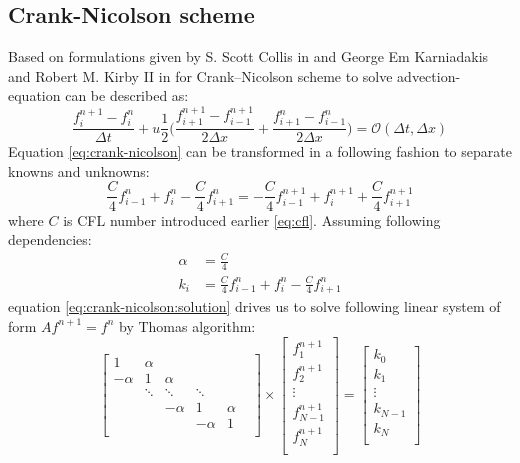 \subsection{Crank-Nicolson scheme} \label{s:general-approach:crank-nicolson-analysis}
	Based on formulations given by S. Scott Collis in \cite{bib:introduction} and George Em Karniadakis and Robert M. Kirby II in \cite{bib:mpi} for Crank--Nicolson scheme to solve \gls{advection-equation} can be described as:
	\begin{equation} \label{eq:crank-nicolson}
		\frac{f_i^{n+1} - f_i^n}{\Delta t} +  u \frac{1}{2} \bigg(\frac{f_{i+1}^{n+1} - f_{i-1}^{n+1}}{2\Delta x} + \frac{f_{i+1}^{n} - f_{i-1}^n}{2\Delta x}\bigg)= \mathcal{O}(\Delta t, \Delta x)
	\end{equation}
	Equation \eqref{eq:crank-nicolson} can be transformed in a following fashion to separate knowns and unknowns:
	\begin{equation} \label{eq:crank-nicolson:solution}
		\frac{C}{4} f_{i-1}^n + f_{i}^n - \frac{C}{4} f_{i+1}^n = -\frac{C}{4} f_{i-1}^{n+1} + f_{i}^{n+1} + \frac{C}{4} f_{i+1}^{n+1}
	\end{equation}
	where $C$ is \gls{CFL} number introduced earlier \eqref{eq:cfl}. Assuming following dependencies:
	\begin{equation}
		\begin{split}
			\alpha &= \frac{C}{4}\\
			 k_i &= \frac{C}{4} f_{i-1}^n + f_{i}^n - \frac{C}{4} f_{i+1}^n
		\end{split}
	\end{equation}
	equation \ref{eq:crank-nicolson:solution} drives us to solve following linear system of form $Af^{n+1} = f^n$ by Thomas algorithm:		
	\begin{equation}
		\begin{bmatrix}
			1 		& \alpha &		  &  	 &		&\\
			-\alpha & 1 	 & \alpha &  	 &		&\\ 
					& \ddots & \ddots &  \ddots	 &		&\\
					&		 &-\alpha & 1 	 &\alpha&\\
					& 		 & 		  &-\alpha&	1	&\\					
		\end{bmatrix} 
		\times
		\begin{bmatrix}
			f_1^{n+1} \\
			f_2^{n+1} \\
			\vdots	\\
			f_{N-1}^{n+1}\\
			f_{N}^{n+1}\\
		\end{bmatrix}
		=
		\begin{bmatrix}
			k_0 \\
			k_1 \\
			\vdots	\\
			k_{N-1} \\
			k_{N} \\
		\end{bmatrix}
	\end{equation}		
